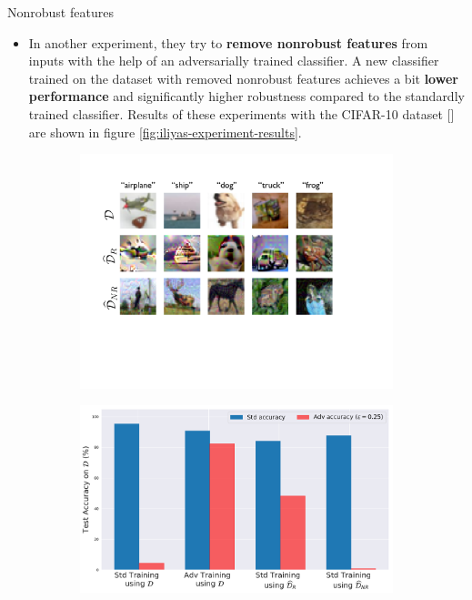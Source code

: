 \documentclass{beamer}
\newcommand{\citep}[1]{{\color{citecolor}\relscale{0.8}[\textcite{#1}]}}
\begin{document}
\begin{frame}[allowframebreaks=0.9]{Nonrobust features}
\begin{itemize}
		\item In another experiment, they try to \textbf{remove nonrobust features} from inputs with the help of an adversarially trained classifier. A new classifier trained on the dataset with removed nonrobust features achieves a bit \textbf{lower performance} and significantly higher robustness compared to the standardly trained classifier. Results of these experiments with the CIFAR-10 dataset \citep{Krizhevsky:2009:LMLFTI} are shown in figure \ref{fig:iliyas-experiment-results}.
	\end{itemize}
	\begin{figure}
		\centering
		\begin{subfigure}[b]{0.49\textwidth}
			\centering
			\includegraphics[width=1.0\textwidth]{figures/adversarial-examples/ilyas/cifar_datasets.pdf}
			\caption{}
			\label{fig:robust_inputs}
		\end{subfigure}
		\hfill
		\begin{subfigure}[b]{0.49\textwidth}
			\centering
			\includegraphics[width=\textwidth]{figures/adversarial-examples/ilyas/CIFAR_res.pdf}

\end{subfigure}
\end{figure}
\end{frame}
\end{document}
